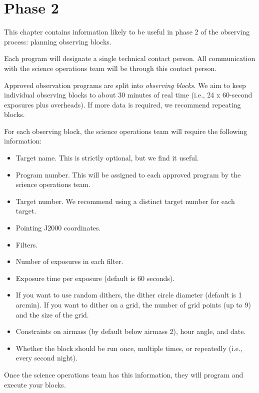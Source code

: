 \chapter{Phase 2}
\label{chapter:phase-2}

This chapter contains information likely to be useful in phase 2 of the observing process: planning observing blocks.

Each program will designate a single technical contact person. All communication with the science operations team will be through this contact person.

Approved observation programs are split into \emph{observing blocks}. We aim to keep individual observing blocks to about 30 minutes of real time (i.e., 24 x 60-second exposures plus overheads). If more data is required, we recommend repeating blocks.

For each observing block, the science operations team will require the following information:

\begin{itemize}
\item Target name. This is strictly optional, but we find it useful.
\item Program number. This will be assigned to each approved program by the science operations team.
\item Target number. We recommend using a distinct target number for each target.
\item Pointing J2000 coordinates.
\item Filters.
\item Number of exposures in each filter.
\item Exposure time per exposure (default is 60 seconds).
\item If you want to use random dithers, the dither circle diameter (default is 1 arcmin). If you want to dither on a grid, the number of grid points (up to 9) and the size of the grid.
\item Constraints on airmass (by default below airmass 2), hour angle, and date.
\item Whether the block should be run once, multiple times, or repeatedly (i.e., every second night).
\end{itemize}

Once the science operations team has this information, they will program and execute your blocks.

